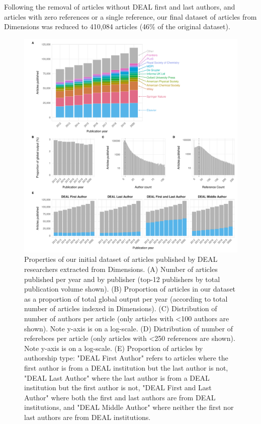 \documentclass[
]{article}
\begin{document}
Following the removal of articles without DEAL first and last authors, and articles with zero references or a single reference, our final dataset of articles from Dimensions was reduced to 410,084 articles (46\% of the original dataset).

\begin{figure}

{\centering \includegraphics{analysis_files/figure-latex/items-overview-1} 

}

\caption{Properties of our initial dataset of articles published by DEAL researchers extracted from Dimensions. (A) Number of articles published per year and by publisher (top-12 publishers by total publication volume shown). (B) Proportion of articles in our dataset as a proportion of total global output per year (according to total number of articles indexed in Dimensions). (C) Distribution of number of authors per article (only articles with <100 authors are shown). Note y-axis is on a log-scale. (D) Distribution of number of referebces per article (only articles with <250 references are shown). Note y-axis is on a log-scale. (E) Proportion of articles by authorship type: "DEAL First Author" refers to articles where the first author is from a DEAL institution but the last author is not, "DEAL Last Author" where the last author is from a DEAL institution but the first author is not, "DEAL First and Last Author" where both the first and last authors are from DEAL institutions, and "DEAL Middle Author" where neither the first nor last authors are from DEAL institutions.}\label{fig:items-overview}
\end{figure}
\end{document}
